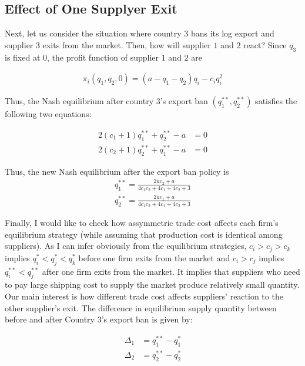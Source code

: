 \documentclass[a4paper,12pt]{article}
\begin{document}
\subsection{Effect of One Supplyer Exit}
Next, let us consider the situation where country $3$ bans its log export and supplier $3$ exits from the market. Then, how will supplier $1$ and $2$ react? Since $q_3$ is fixed at $0$, the profit function of supplier $1$ and $2$ are 

\begin{align}
    \pi_i (q_1, q_2, 0) = (a - q_1 - q_2) q_{i} - c_{i} q_i ^ 2 
\end{align}

Thus, the Nash equilibrium after country $3$'s export ban $(q_1^{**}, q_2^{**})$ satisfies the following two equations:

\begin{align}
    2(c_1 + 1) q_1^{**} + q_2 ^{**} - a &= 0 \\
    2(c_2 + 1) q_2^{**} + q_1 ^ {**} - a &= 0 
\end{align}

Thus, the new Nash equilibrium after the export ban policy is
\begin{align}
    q_1^{**} = \frac{2 a c_{2} + a}{4 c_{1} c_{2} + 4 c_{1} + 4 c_{2} + 3} \\
    q_2^{**} = \frac{2 a c_{1} + a}{4 c_{1} c_{2} + 4 c_{1} + 4 c_{2} + 3}
\end{align}

Finally, I would like to check how assymmetric trade cost affects each firm's equilibrium strategy (while assuming that production cost is identical among suppliers). As I can infer obviously from the equilibrium strategies, $c_i > c_j > c_k$ implies $q_i^* < q_j^* < q_k^*$ before one firm exits from the market and $c_i > c_j$ implies $q_i^{**} < q_j^{**}$ after one firm exits from the market. It implies that suppliers who need to pay large shipping cost to supply the market produce relatively small quantity. Our main interest is how different trade cost affects suppliers' reaction to the other supplier's exit. The difference in equilibrium supply quantity between before and after Country $3$'s export ban is given by:

\begin{align}
    \Delta_1 &= q_1^{**} - q_1^{*} \\
    \Delta_2 &= q_2^{**} - q_2^{*}
\end{align}
\end{document}
